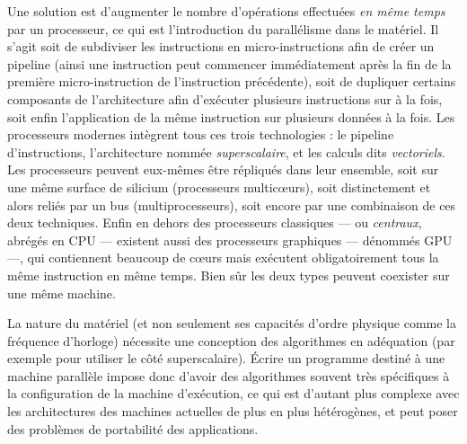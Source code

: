 Une solution est d'augmenter le nombre d'opérations effectuées \emph{en même temps} par un processeur, ce qui est l'introduction du parallélisme dans le matériel.
Il s'agit soit de subdiviser les instructions en  micro-instructions afin de créer un pipeline (ainsi une instruction peut commencer immédiatement après la fin de la première micro-instruction de l'instruction précédente), soit de dupliquer certains composants de l'architecture afin d'exécuter plusieurs instructions sur à la fois, soit enfin l'application de la même instruction sur plusieurs données à la fois. Les processeurs modernes intègrent tous ces trois technologies : le pipeline d'instructions, l'architecture nommée \emph{superscalaire}, et les calculs dits \emph{vectoriels}.
Les processeurs peuvent eux-mêmes être répliqués dans leur ensemble, soit sur une même surface de silicium (processeurs multicœurs), soit distinctement et alors reliés par un bus (multiprocesseurs), soit encore par une combinaison de ces deux techniques.
Enfin en dehors des processeurs classiques --- ou \emph{centraux}, abrégés en CPU --- existent aussi des processeurs graphiques --- dénommés GPU ---, qui contiennent beaucoup de cœurs mais exécutent obligatoirement tous la même instruction en même temps. Bien sûr les deux types peuvent coexister sur une même machine.

La nature du matériel (et non seulement ses capacités d'ordre physique comme la fréquence d'horloge) nécessite une conception des algorithmes en adéquation (par exemple pour utiliser le côté superscalaire). 
Écrire un programme destiné à une machine parallèle impose donc d'avoir des algorithmes souvent très spécifiques à la configuration de la machine d'exécution, ce qui est d'autant plus complexe avec les architectures des machines actuelles de plus en plus hétérogènes, et peut poser des problèmes de portabilité des applications.

